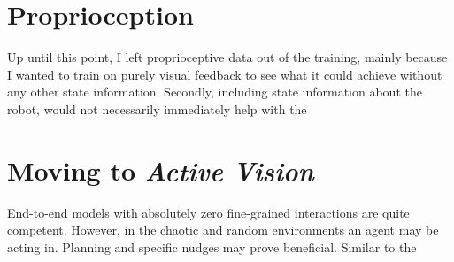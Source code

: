 \section{Proprioception}
Up until this point, I left proprioceptive data out of the training, mainly because I wanted to train on purely visual feedback to see what it could achieve without any other state information. Secondly, including state information about the robot, would not necessarily immediately help with the 

\section{Moving to \emph{Active Vision}}
End-to-end models with absolutely zero fine-grained interactions are quite competent. However, in the chaotic and random environments an agent may be acting in. Planning and specific nudges may prove beneficial. Similar to the 



